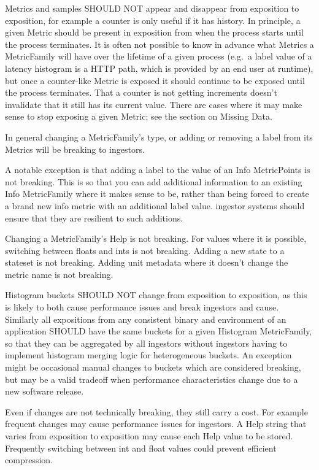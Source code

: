 \documentclass[a4paper,12pt,notitlepage,twoside,openright]{article}
\begin{document}
Metrics and samples SHOULD NOT appear and disappear from exposition to
exposition, for example a counter is only useful if it has history. In
principle, a given Metric should be present in exposition from when the
process starts until the process terminates. It is often not possible to
know in advance what Metrics a MetricFamily will have over the lifetime
of a given process (e.g.~a label value of a latency histogram is a HTTP
path, which is provided by an end user at runtime), but once a
counter-like Metric is exposed it should continue to be exposed until
the process terminates. That a counter is not getting increments doesn't
invalidate that it still has its current value. There are cases where it
may make sense to stop exposing a given Metric; see the section on
Missing Data.

In general changing a MetricFamily's type, or adding or removing a label
from its Metrics will be breaking to ingestors.

A notable exception is that adding a label to the value of an Info
MetricPoints is not breaking. This is so that you can add additional
information to an existing Info MetricFamily where it makes sense to be,
rather than being forced to create a brand new info metric with an
additional label value. ingestor systems should ensure that they are
resilient to such additions.

Changing a MetricFamily's Help is not breaking. For values where it is
possible, switching between floats and ints is not breaking. Adding a
new state to a stateset is not breaking. Adding unit metadata where it
doesn't change the metric name is not breaking.

Histogram buckets SHOULD NOT change from exposition to exposition, as
this is likely to both cause performance issues and break ingestors and
cause. Similarly all expositions from any consistent binary and
environment of an application SHOULD have the same buckets for a given
Histogram MetricFamily, so that they can be aggregated by all ingestors
without ingestors having to implement histogram merging logic for
heterogeneous buckets. An exception might be occasional manual changes
to buckets which are considered breaking, but may be a valid tradeoff
when performance characteristics change due to a new software release.

Even if changes are not technically breaking, they still carry a cost.
For example frequent changes may cause performance issues for ingestors.
A Help string that varies from exposition to exposition may cause each
Help value to be stored. Frequently switching between int and float
values could prevent efficient compression.
\end{document}
